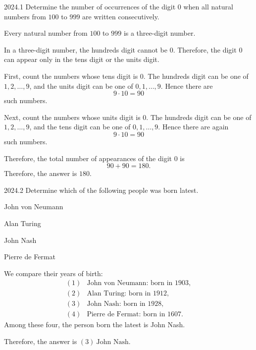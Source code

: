     \begin{pastproblem}{2024.1}
        Determine the number of occurrences of the digit $0$ when all natural numbers from $100$ to
        $999$ are written consecutively.
    \end{pastproblem}

    \begin{solution}
        Every natural number from $100$ to $999$ is a three-digit number.

        In a three-digit number, the hundreds digit cannot be $0$. Therefore, the digit $0$ can
        appear only in the tens digit or the units digit.

        First, count the numbers whose tens digit is $0$. The hundreds digit can be one of
        $1,2,\dots,9$, and the units digit can be one of $0,1,\dots,9$. Hence there are
        \[
            9\cdot 10=90
        \]
        such numbers.

        Next, count the numbers whose units digit is $0$. The hundreds digit can be one of
        $1,2,\dots,9$, and the tens digit can be one of $0,1,\dots,9$. Hence there are again
        \[
            9\cdot 10=90
        \]
        such numbers.

        Therefore, the total number of appearances of the digit $0$ is
        \[
            90+90=180.
        \]
        Therefore, the answer is $\boxed{180}$.
    \end{solution}

    \begin{pastproblem}{2024.2}
        Determine which of the following people was born latest.
        \begin{problemchoices}
            \item John von Neumann
            \item Alan Turing
            \item John Nash
            \item Pierre de Fermat
        \end{problemchoices}
    \end{pastproblem}

    \begin{solution}
        We compare their years of birth:
        \[
            \begin{array}{ll}
                (1) & \text{John von Neumann: born in } 1903, \\
                (2) & \text{Alan Turing: born in } 1912, \\
                (3) & \text{John Nash: born in } 1928, \\
                (4) & \text{Pierre de Fermat: born in } 1607.
            \end{array}
        \]
        Among these four, the person born the latest is John Nash.

        Therefore, the answer is $\boxed{(3)\ \text{John Nash}}$.
    \end{solution}

